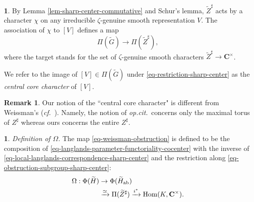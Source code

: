 \documentclass[10pt,english,reqno]{amsart}
\newcommand{\complexes}{\mathbf C}
\newcommand{\Hom}{\operatorname{Hom}}
\newcommand{\abelian}{\textnormal{ab}}
\theoremstyle{definition}
\newtheorem{rem}[subsubsection]{Remark}
\numberwithin{equation}{section}
\newtheorem{untitledsubsubsection}[subsubsection]{}
\newenvironment{void}
{\begin{untitledsubsubsection}}
{\end{untitledsubsubsection}}
\begin{document}
\begin{void}
\label{void-central-core-character}
By Lemma \ref{lem-sharp-center-commutative} and Schur's lemma, $\widetilde Z^{\sharp}$ acts by a character $\chi$ on any irreducible $\zeta$-genuine smooth representation $V$. The association of $\chi$ to $[V]$ defines a map
\begin{equation}
\label{eq-restriction-sharp-center}
	\Pi(\widetilde G) \rightarrow \Pi(\widetilde Z^{\sharp}),
\end{equation}
where the target stands for the set of $\zeta$-genuine smooth characters $\widetilde Z^{\sharp} \rightarrow \complexes^{\times}$.

We refer to the image of $[V] \in \Pi(\widetilde G)$ under \eqref{eq-restriction-sharp-center} as the \emph{central core character} of $[V]$.
\end{void}


\begin{rem}
Our notion of the ``central core character" is different from Weissman's (\emph{cf.}~\cite[\S6.3]{MR3802418}). Namely, the notion of \emph{op.cit.}~concerns only the maximal torus of $Z^{\sharp}$ whereas ours concerns the entire $Z^{\sharp}$.
\end{rem}


\begin{void}\emph{Definition of $\Omega$.}
The map \eqref{eq-weissman-obstruction} is defined to be the composition of \eqref{eq-langlands-parameter-functoriality-cocenter} with the inverse of \eqref{eq-local-langlands-correspondence-sharp-center} and the restriction along \eqref{eq-obstruction-subgroup-sharp-center}:
\begin{align*}
\Omega : \Phi(\widetilde H) &\rightarrow \Phi(\widetilde H_{\abelian}) \\
 &\xrightarrow{\simeq} \Pi(\widetilde Z^{\sharp}) \xrightarrow{i^*} \Hom(K, \complexes^{\times}).
\end{align*}
\end{void}

\end{document}
